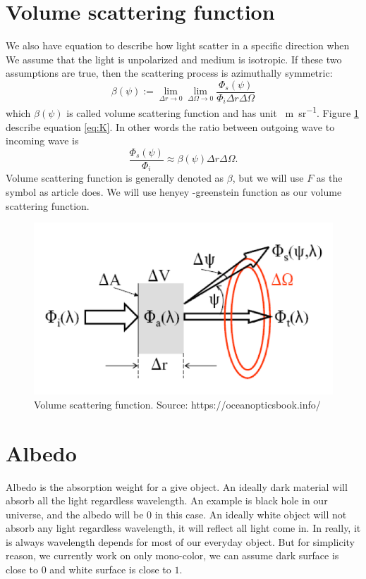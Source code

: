 \documentclass{article}
\begin{document}
\section{Volume scattering function}
We also have equation to describe how light scatter in a specific direction when We assume that the light is unpolarized and medium is isotropic. If these two assumptions are true, then the scattering process is azimuthally symmetric:
\begin{equation}
    \beta(\psi) := \lim_{\Delta r \to 0} \lim_{\Delta \Omega \to 0} \frac{\Phi_s(\psi)}{\Phi_i \Delta r \Delta \Omega}
\end{equation}
which $\beta(\psi)$ is called volume scattering function and has unit \si{\per\meter\per\steradian}. Figure \ref{fig:scattering} describe equation \ref{eq:K}. In other words the ratio between outgoing wave to incoming wave is 
\begin{equation}
    \frac{\Phi_s(\psi)}{\Phi_i} \approx \beta(\psi)\Delta r \Delta \Omega.
\end{equation}
Volume scattering function is generally denoted as $\beta$, but we will use $F$ as the symbol as article \cite{gupta2008controlling} does. We will use henyey -greenstein function \cite{Haltrin:02} as our volume scattering function.

\begin{figure}[h]
    \centering
    \includegraphics[width=\textwidth]{scattering.png}
    \caption{Volume scattering function. Source: https://oceanopticsbook.info/}
    \label{fig:scattering}
\end{figure}

\section{Albedo}
Albedo is the absorption weight for a give object. An ideally dark material will absorb all the light regardless wavelength. An example is black hole in our universe, and the albedo will be $0$ in this case. An ideally white object will not absorb any light regardless wavelength, it will reflect all light come in. In really, it is always wavelength depends for most of our everyday object. But for simplicity reason, we currently work on only mono-color, we can assume dark surface is close to $0$ and white surface is close to $1$.
\end{document}
